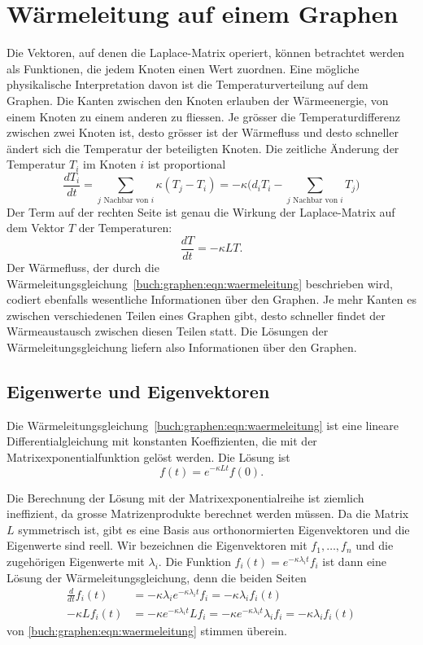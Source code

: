 %
%
%
\section{Wärmeleitung auf einem Graphen
\label{buch:section:waermeleitung-auf-einem-graphen}}
Die Vektoren, auf denen die Laplace-Matrix operiert, können betrachtet
werden als Funktionen, die jedem Knoten einen Wert zuordnen.
Eine mögliche physikalische Interpretation davon ist die Temperaturverteilung
auf dem Graphen.
Die Kanten zwischen den Knoten erlauben der Wärmeenergie, von einem Knoten
zu einem anderen zu fliessen.
Je grösser die Temperaturdifferenz zwischen zwei Knoten ist, desto
grösser ist der Wärmefluss und desto schneller ändert sich die Temperatur
der beteiligten Knoten.
Die zeitliche Änderung der Temperatur $T_i$ im Knoten $i$ ist proportional
\[
\frac{dT_i}{dt}
=
\sum_{\text{$j$ Nachbar von $i$}} \kappa (T_j-T_i)
=
-
\kappa
\biggl(
d_iT_i
-
\sum_{\text{$j$ Nachbar von $i$}} T_j
\biggr)
\]
Der Term auf der rechten Seite ist genau die Wirkung der 
Laplace-Matrix auf dem Vektor $T$ der Temperaturen:
\begin{equation}
\frac{dT}{dt}
=
-\kappa L T.
\label{buch:graphen:eqn:waermeleitung}
\end{equation}
Der Wärmefluss, der durch die
Wärmeleitungsgleichung~\eqref{buch:graphen:eqn:waermeleitung} beschrieben
wird, codiert ebenfalls wesentliche Informationen über den Graphen.
Je mehr Kanten es zwischen verschiedenen Teilen eines Graphen gibt,
desto schneller findet der Wärmeaustausch zwischen diesen Teilen
statt.
Die Lösungen der Wärmeleitungsgleichung liefern also Informationen 
über den Graphen.

\subsection{Eigenwerte und Eigenvektoren
\label{buch:subsection:ein-zyklischer-graph}}
Die Wärmeleitungsgleichung~\eqref{buch:graphen:eqn:waermeleitung} 
ist eine lineare Differentialgleichung mit konstanten Koeffizienten,
die mit der Matrixexponentialfunktion gelöst werden.
Die Lösung ist
\[
f(t) = e^{-\kappa Lt}f(0).
\]

Die Berechnung der Lösung mit der Matrixexponentialreihe ist ziemlich
ineffizient, da grosse Matrizenprodukte berechnet werden müssen.
Da die Matrix $L$ symmetrisch ist, gibt es eine Basis aus 
orthonormierten Eigenvektoren und die Eigenwerte sind reell.
Wir bezeichnen die Eigenvektoren mit $f_1,\dots,f_n$  und die
zugehörigen Eigenwerte mit $\lambda_i$.
Die Funktion $f_i(t)= e^{-\kappa\lambda_it}f_i$ ist dann eine Lösung
der Wärmeleitungsgleichung, denn die beiden Seiten
\begin{align*}
\frac{d}{dt}f_i(t)
&=
-\kappa\lambda_ie^{-\kappa\lambda_it}f_i
=
-\kappa\lambda_i f_i(t)
\\
-\kappa Lf_i(t)
&=
-\kappa e^{-\kappa\lambda_it} Lf_i
=
-\kappa e^{-\kappa\lambda_it} \lambda_i f_i
=
-\kappa \lambda_i f_i(t)
\end{align*}
von \eqref{buch:graphen:eqn:waermeleitung} stimmen überein.

